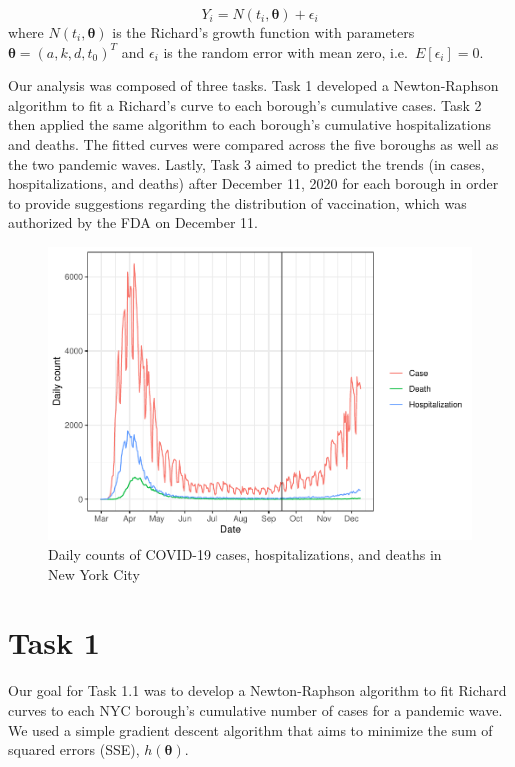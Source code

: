 \documentclass[
]{article}
\begin{document}
\[Y_i = N(t_i, \boldsymbol{\theta}) + \epsilon_i\] where
\(N(t_i, \boldsymbol{\theta})\) is the Richard's growth function with
parameters \(\boldsymbol{\theta} = (a, k, d, t_0)^T\) and \(\epsilon_i\)
is the random error with mean zero, i.e.~\(E[\epsilon_i] = 0\).

Our analysis was composed of three tasks. Task 1 developed a
Newton-Raphson algorithm to fit a Richard's curve to each borough's
cumulative cases. Task 2 then applied the same algorithm to each
borough's cumulative hospitalizations and deaths. The fitted curves were
compared across the five boroughs as well as the two pandemic waves.
Lastly, Task 3 aimed to predict the trends (in cases, hospitalizations,
and deaths) after December 11, 2020 for each borough in order to provide
suggestions regarding the distribution of vaccination, which was
authorized by the FDA on December 11.

\begin{figure}
\centering
\includegraphics{report_files/figure-latex/unnamed-chunk-3-1.pdf}
\caption{Daily counts of COVID-19 cases, hospitalizations, and deaths in
New York City}
\end{figure}

\hypertarget{task-1}{%
\section{Task 1}\label{task-1}}

Our goal for Task 1.1 was to develop a Newton-Raphson algorithm to fit
Richard curves to each NYC borough's cumulative number of cases for a
pandemic wave. We used a simple gradient descent algorithm that aims to
minimize the sum of squared errors (SSE), \(h(\boldsymbol{\theta})\).
\end{document}
